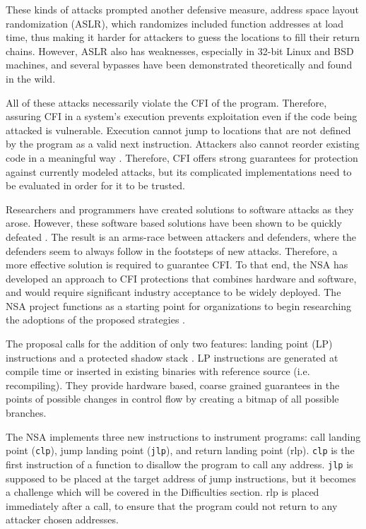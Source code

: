 \documentclass[conference,compsoc]{IEEEtran}
\begin{document}
These kinds of attacks prompted another defensive measure, address space layout randomization (ASLR), which randomizes included function addresses at load time, thus making it harder for attackers to guess the locations to fill their return chains. However, ASLR also has weaknesses, especially in 32-bit Linux and BSD machines\cite{Shacham:2004}, and several bypasses have been demonstrated theoretically and found in the wild\cite{Wang, Chen}.

All of these attacks necessarily violate the CFI of the program. Therefore, assuring CFI in a system's execution prevents exploitation even if the code being attacked is vulnerable. Execution cannot jump to locations that are not defined by the program as a valid next instruction. Attackers also cannot reorder existing code in a meaningful way \cite{abadi}. Therefore, CFI offers strong guarantees for protection against currently modeled attacks, but its complicated implementations need to be evaluated in order for it to be trusted.

Researchers and programmers have created solutions to software attacks as they arose\cite{Cowan, Vendicator}. However, these software based solutions have been shown to be quickly defeated \cite{Richarte}. The result is an arms-race between attackers and defenders, where the defenders seem to always follow in the footsteps of new attacks. Therefore, a more effective solution is required to guarantee CFI. To that end, the NSA has developed an approach to CFI protections that combines hardware and software, and would require significant industry acceptance to be widely deployed. The NSA project functions as a starting point for organizations to begin researching the adoptions of the proposed strategies \cite{NSAGitHub}.

The proposal calls for the addition of only two features: landing point (LP) instructions and a protected shadow stack \cite{NSAGitHub}. LP instructions are generated at compile time or inserted in existing binaries with reference source (i.e. recompiling). They provide hardware based, coarse grained guarantees in the points of possible changes in control flow by creating a bitmap of all possible branches.

The NSA implements three new instructions to instrument programs: call landing point (\texttt{clp}), jump landing point (\texttt{jlp}), and return landing point (rlp). \texttt{clp} is the first instruction of a function to disallow the program to call any address. \texttt{jlp} is supposed to be placed at the target address of jump instructions, but it becomes a challenge which will be covered in the Difficulties section. rlp is placed immediately after a call, to ensure that the program could not return to any attacker chosen addresses.
\end{document}
